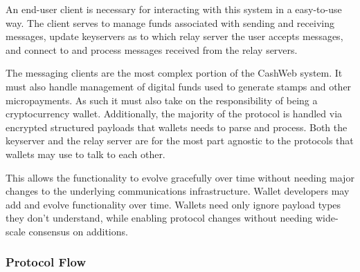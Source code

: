 \documentclass{article}
\begin{document}
An end-user client is necessary for interacting with this system in a easy-to-use way. The client serves to manage funds associated with sending and receiving messages, update keyservers as to which relay server the user accepts messages, and connect to and process messages received from the relay servers.

The messaging clients are the most complex portion of the CashWeb system. It must also handle management of digital funds used to generate stamps and other micropayments. As such it must also take on the responsibility of being a cryptocurrency wallet. Additionally, the majority of the protocol is handled via encrypted structured payloads that wallets needs to parse and process. Both the keyserver and the relay server are for the most part agnostic to the protocols that wallets may use to talk to each other.

This allows the functionality to evolve gracefully over time without needing major changes to the underlying communications infrastructure. Wallet developers may add and evolve functionality over time. Wallets need only ignore payload types they don't understand, while enabling protocol changes without needing wide-scale consensus on additions.

\subsubsection{Protocol Flow}

\begin{figure}[H]
  \begin{center}
  \end{center}
\end{figure}
\end{document}
